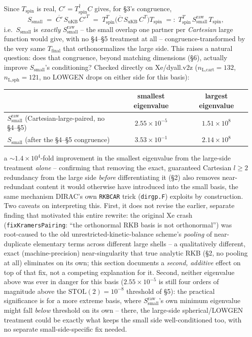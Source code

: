 \documentclass[11pt]{article}
\begin{document}
Since $T_{\text{spin}}$ is real, $C'=T_{\text{spin}}^{\dagger}C$ gives, for \S3's congruence,
\begin{equation}
S_{\text{small}} \;=\; \overline{C'}\,S_{\text{uKB}}\,C'^{T}
\;=\; T_{\text{spin}}^{T}\big(\overline{C}\,S_{\text{uKB}}\,C^{T}\big)T_{\text{spin}}
\;=:\; T_{\text{spin}}^{T}\,S_{\text{small}}^{\text{raw}}\,T_{\text{spin}},
\end{equation}
i.e.\ $S_{\text{small}}$ is \emph{exactly} $S_{\text{small}}^{\text{raw}}$ -- the small overlap one
partner per \emph{Cartesian} large function would give, with no \S4--\S5 treatment at all --
congruence-transformed by the very same $T_{\text{final}}$ that orthonormalizes the large side. This
raises a natural question: does that congruence, beyond matching dimensions (\S6), actually improve
$S_{\text{small}}$'s conditioning? Checked directly on Xe/dyall.v2z ($n_{\text{L,cart}}=132$,
$n_{\text{L,sph}}=121$, no LOWGEN drops on either side for this basis):
\begin{center}
\begin{tabular}{lcc}
 & smallest eigenvalue & largest eigenvalue \\\hline
$S_{\text{small}}^{\text{raw}}$ (Cartesian-large-paired, no \S4--\S5) & $2.55\times10^{-5}$ & $1.51\times10^{8}$ \\
$S_{\text{small}}$ (after the \S4--\S5 congruence) & $3.53\times10^{-1}$ & $2.14\times10^{8}$
\end{tabular}
\end{center}
a $\sim\!1.4\times10^4$-fold improvement in the smallest eigenvalue from the large-side treatment
\emph{alone} -- confirming that removing the exact, guaranteed Cartesian $l\ge2$ redundancy from the
large side \emph{before} differentiating it (\S2) also removes near-redundant content it would
otherwise have introduced into the small basis, the same mechanism DIRAC's own \texttt{RKBCAR} trick
(\texttt{dirgp.F}) exploits by construction. Two caveats on interpreting this. First, it does not
revise the earlier, separate finding that motivated this entire rewrite: the original Xe crash
(\texttt{fixKramersPairing}: ``the orthonormal RKB basis is not orthonormal'') was root-caused to the
old unrestricted-kinetic-balance scheme's \emph{pooling} of near-duplicate elementary terms across
different large shells -- a qualitatively different, exact (machine-precision) near-singularity that
true analytic RKB (\S2, no pooling at all) eliminates on its own; this section documents a
\emph{second, additive} effect on top of that fix, not a competing explanation for it. Second,
neither eigenvalue above was ever in danger for this basis ($2.55\times10^{-5}$ is still four orders
of magnitude above the $\text{STOL}(2)=10^{-8}$ threshold of \S5): the practical significance is for
a more extreme basis, where $S_{\text{small}}^{\text{raw}}$'s own minimum eigenvalue might fall
\emph{below} threshold on its own -- there, the large-side spherical/LOWGEN treatment could be
exactly what keeps the small side well-conditioned too, with no separate small-side-specific fix
needed.
\end{document}
